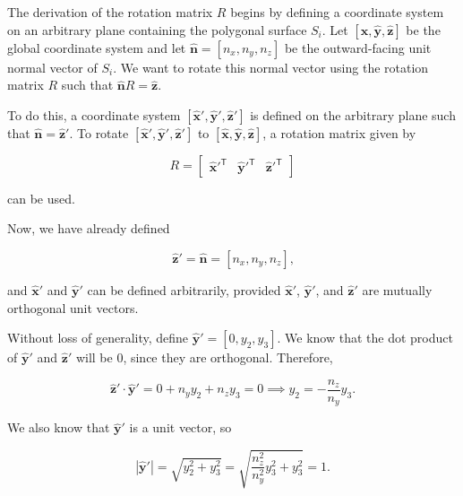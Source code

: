 The derivation of the rotation matrix \(R\) begins by defining a coordinate system on an arbitrary plane containing the polygonal surface \(S_{\!i}\). Let \(\left[ \hat{\mathbf{x}}, \hat{\mathbf{y}}, \hat{\mathbf{z}}\right]\) be the global coordinate system and let \(\hat{\mathbf{n}} = \left[ n_x, n_y, n_z\right]\) be the outward-facing unit normal vector of \(S_{\!i}\). We want to rotate this normal vector using the rotation matrix \(R\) such that \(\hat{\mathbf{n}} R = \hat{\mathbf{z}}\).

To do this, a coordinate system \(\left[ \hat{\mathbf{x}}', \hat{\mathbf{y}}', \hat{\mathbf{z}}' \right]\) is defined on the arbitrary plane such that \( \hat{\mathbf{n}} = \hat{\mathbf{z}}'\). To rotate \(\left[ \hat{\mathbf{x}}', \hat{\mathbf{y}}', \hat{\mathbf{z}}' \right]\) to \(\left[ \hat{\mathbf{x}}, \hat{\mathbf{y}}, \hat{\mathbf{z}}\right]\), a rotation matrix given by

\begin{equation}
R = \begin{bmatrix}
\hat{\mathbf{x}}'^{\textsf{T}} & \hat{\mathbf{y}}'^{\textsf{T}} & \hat{\mathbf{z}}'^{\textsf{T}}
\end{bmatrix}
\end{equation}

\noindent can be used.

Now, we have already defined

\begin{equation}
\hat{\mathbf{z}}' = \hat{\mathbf{n}} = \left[ n_x, n_y, n_z \right] \text{,}
\end{equation}

\noindent and \(\hat{\mathbf{x}}'\) and \(\hat{\mathbf{y}}'\) can be defined arbitrarily, provided \(\hat{\mathbf{x}}'\), \(\hat{\mathbf{y}}'\), and \(\hat{\mathbf{z}}'\) are mutually orthogonal unit vectors.

Without loss of generality, define \(\hat{\mathbf{y}}' = \left[ 0, y_2, y_3\right]\). We know that the dot product of \(\hat{\mathbf{y}}'\) and \(\hat{\mathbf{z}}'\) will be 0, since they are orthogonal. Therefore,

\begin{equation}\label{eqn:p2y2y3}
\hat{\mathbf{z}}' \cdot \hat{\mathbf{y}}' = 0 + n_y y_2 + n_z y_3 = 0 \implies y_2 = -\frac{n_z}{n_y} y_3 \text{.}
\end{equation}

\noindent We also know that \(\hat{\mathbf{y}}'\) is a unit vector, so

\begin{equation}\label{eqn:p2y2y32}
\left|\hat{\mathbf{y}}'\right| = \sqrt{y_2^2 + y_3^2} = \sqrt{\frac{n_z^2}{n_y^2} y_3^2 + y_3^2} = 1 \text{.}
\end{equation}

